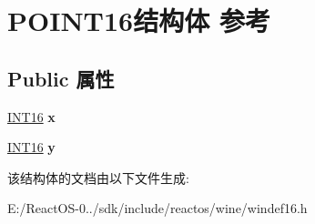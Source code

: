 \hypertarget{struct_p_o_i_n_t16}{}\section{P\+O\+I\+N\+T16结构体 参考}
\label{struct_p_o_i_n_t16}
\subsection*{Public 属性}
\begin{DoxyCompactItemize}
\item 
\mbox{\label{struct_p_o_i_n_t16_a192e764607d8a818761e2e4afe442a56}} 
\hyperlink{_processor_bind_8h_a30f500129d8c688af07726d5d34ce52d}{I\+N\+T16} {\bfseries x}
\item 
\mbox{\label{struct_p_o_i_n_t16_afc3e24fb0020127bd3d94ed3f9be10fe}} 
\hyperlink{_processor_bind_8h_a30f500129d8c688af07726d5d34ce52d}{I\+N\+T16} {\bfseries y}
\end{DoxyCompactItemize}


该结构体的文档由以下文件生成\+:\begin{DoxyCompactItemize}
\item 
E\+:/\+React\+O\+S-\/0../sdk/include/reactos/wine/windef16.\+h\end{DoxyCompactItemize}
